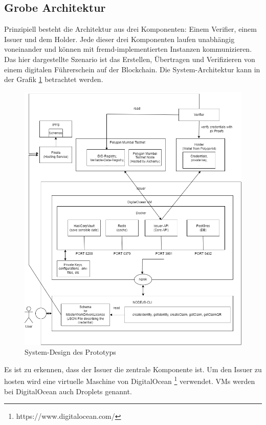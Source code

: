 \subsection{Grobe Architektur}
Prinzipiell besteht die Architektur aus drei Komponenten: Einem Verifier, einem Issuer und dem Holder. Jede dieser drei Komponenten laufen unabhängig voneinander und können mit fremd-implementierten Instanzen kommunizieren. Das hier dargestellte Szenario ist das Erstellen, Übertragen und Verifizieren von einem digitalen Führerschein auf der Blockchain. Die System-Architektur kann in der Grafik \ref{fig:design} betrachtet werden.
\begin{figure}[H]
	\centering
	\includegraphics[scale=0.5]{media/system-design}
	\caption{System-Design des Prototyps}
	\label{fig:design}
\end{figure}
Es ist zu erkennen, dass der Issuer die zentrale Komponente ist. Um den Issuer zu hosten wird eine virtuelle Maschine von DigitalOcean \footnote{https://www.digitalocean.com/} verwendet. VMs werden bei DigitalOcean auch Droplets genannt.


